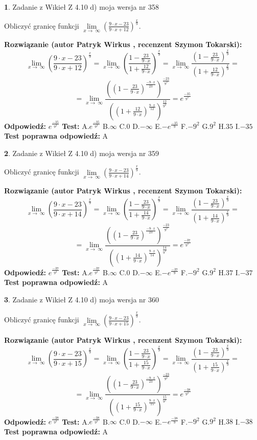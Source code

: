 \documentclass[12pt, a4paper]{article}
\theoremstyle{definition} %
\newtheorem{zad}{}
\newcommand{\zadStart}[1]{\begin{zad}#1\newline}
\newcommand{\zadStop}{\end{zad}}
\newcommand{\rozwStart}[2]{\noindent \textbf{Rozwiązanie (autor #1 , recenzent #2): }\newline}
\newcommand{\rozwStop}{\newline}
\newcommand{\odpStart}{\noindent \textbf{Odpowiedź:}\newline}
\newcommand{\odpStop}{\newline}
\newcommand{\testStart}{\noindent \textbf{Test:}\newline}
\newcommand{\testStop}{\newline}
\newcommand{\kluczStart}{\noindent \textbf{Test poprawna odpowiedź:}\newline}
\newcommand{\kluczStop}{\newline}
\begin{document}
\zadStart{Zadanie z Wikieł Z 4.10 d) moja wersja nr 358}


Obliczyć granicę funkcji  $\lim\limits_{x\to\ \infty}(\frac{9\cdot x-23}{9\cdot x+12})^{\frac{x}{9}}$.
\zadStop
\rozwStart{Patryk Wirkus}{Szymon Tokarski}
$$\lim\limits_{x\to\ \infty}(\frac{9\cdot x-23}{9\cdot x+12})^{\frac{x}{9}} = \lim\limits_{x\to\ \infty}(\frac{1-\frac{23}{9\cdot x}}{1+\frac{12}{9\cdot x}})^{\frac{x}{9}}=\lim\limits_{x\to\ \infty}\frac{(1-\frac{23}{9\cdot x})^{\frac{x}{9}}}{(1+\frac{12}{9\cdot x})^{\frac{x}{9}}}=$$
$$=\lim\limits_{x\to\ \infty}\frac{((1-\frac{23}{9\cdot x})^{\frac{-9\cdot x}{23}})^{\frac{-23}{9^{2}}}}{((1+\frac{12}{9\cdot x})^{\frac{9\cdot x}{12}})^{\frac{12}{9^{2}}}}=e^{\frac{-35}{9^{2}}}$$
\rozwStop
\odpStart
$e^{\frac{-35}{9^{2}}}$
\odpStop
\testStart
A.$e^{\frac{-35}{9^{2}}}$ B.$\infty$ C.$0$ D.$-\infty$ E.$-e^{\frac{-35}{9}}$
F.$-9^{2}$ G.$9^{2}$
H.$35$
I.$-35$
\testStop
\kluczStart
A
\kluczStop



\zadStart{Zadanie z Wikieł Z 4.10 d) moja wersja nr 359}


Obliczyć granicę funkcji  $\lim\limits_{x\to\ \infty}(\frac{9\cdot x-23}{9\cdot x+14})^{\frac{x}{9}}$.
\zadStop
\rozwStart{Patryk Wirkus}{Szymon Tokarski}
$$\lim\limits_{x\to\ \infty}(\frac{9\cdot x-23}{9\cdot x+14})^{\frac{x}{9}} = \lim\limits_{x\to\ \infty}(\frac{1-\frac{23}{9\cdot x}}{1+\frac{14}{9\cdot x}})^{\frac{x}{9}}=\lim\limits_{x\to\ \infty}\frac{(1-\frac{23}{9\cdot x})^{\frac{x}{9}}}{(1+\frac{14}{9\cdot x})^{\frac{x}{9}}}=$$
$$=\lim\limits_{x\to\ \infty}\frac{((1-\frac{23}{9\cdot x})^{\frac{-9\cdot x}{23}})^{\frac{-23}{9^{2}}}}{((1+\frac{14}{9\cdot x})^{\frac{9\cdot x}{14}})^{\frac{14}{9^{2}}}}=e^{\frac{-37}{9^{2}}}$$
\rozwStop
\odpStart
$e^{\frac{-37}{9^{2}}}$
\odpStop
\testStart
A.$e^{\frac{-37}{9^{2}}}$ B.$\infty$ C.$0$ D.$-\infty$ E.$-e^{\frac{-37}{9}}$
F.$-9^{2}$ G.$9^{2}$
H.$37$
I.$-37$
\testStop
\kluczStart
A
\kluczStop



\zadStart{Zadanie z Wikieł Z 4.10 d) moja wersja nr 360}


Obliczyć granicę funkcji  $\lim\limits_{x\to\ \infty}(\frac{9\cdot x-23}{9\cdot x+15})^{\frac{x}{9}}$.
\zadStop
\rozwStart{Patryk Wirkus}{Szymon Tokarski}
$$\lim\limits_{x\to\ \infty}(\frac{9\cdot x-23}{9\cdot x+15})^{\frac{x}{9}} = \lim\limits_{x\to\ \infty}(\frac{1-\frac{23}{9\cdot x}}{1+\frac{15}{9\cdot x}})^{\frac{x}{9}}=\lim\limits_{x\to\ \infty}\frac{(1-\frac{23}{9\cdot x})^{\frac{x}{9}}}{(1+\frac{15}{9\cdot x})^{\frac{x}{9}}}=$$
$$=\lim\limits_{x\to\ \infty}\frac{((1-\frac{23}{9\cdot x})^{\frac{-9\cdot x}{23}})^{\frac{-23}{9^{2}}}}{((1+\frac{15}{9\cdot x})^{\frac{9\cdot x}{15}})^{\frac{15}{9^{2}}}}=e^{\frac{-38}{9^{2}}}$$
\rozwStop
\odpStart
$e^{\frac{-38}{9^{2}}}$
\odpStop
\testStart
A.$e^{\frac{-38}{9^{2}}}$ B.$\infty$ C.$0$ D.$-\infty$ E.$-e^{\frac{-38}{9}}$
F.$-9^{2}$ G.$9^{2}$
H.$38$
I.$-38$
\testStop
\kluczStart
A
\kluczStop
\end{document}
